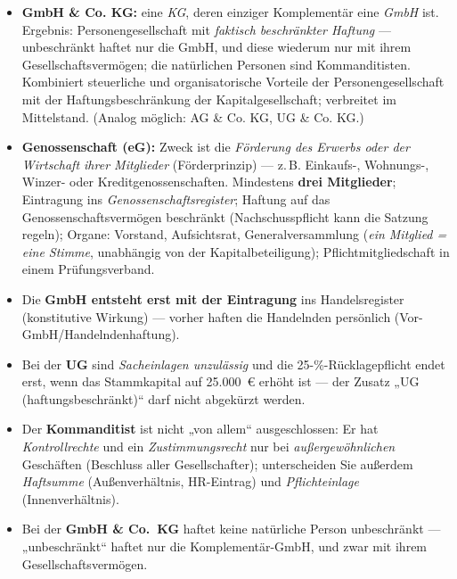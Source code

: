 \documentclass[11pt, a4paper]{article}
\begin{document}
\begin{itemize}
  \item \textbf{GmbH \& Co. KG:} eine \emph{KG}, deren einziger Komplementär eine
    \emph{GmbH} ist. Ergebnis: Personengesellschaft mit \emph{faktisch beschränkter
    Haftung} --- unbeschränkt haftet nur die GmbH, und diese wiederum nur mit ihrem
    Gesellschaftsvermögen; die natürlichen Personen sind Kommanditisten. Kombiniert
    steuerliche und organisatorische Vorteile der Personengesellschaft mit der
    Haftungsbeschränkung der Kapitalgesellschaft; verbreitet im Mittelstand.
    (Analog möglich: AG \& Co. KG, UG \& Co. KG.)
  \item \textbf{Genossenschaft (eG):} Zweck ist die \emph{Förderung des Erwerbs oder der
    Wirtschaft ihrer Mitglieder} (Förderprinzip) --- z.\,B. Einkaufs-, Wohnungs-,
    Winzer- oder Kreditgenossenschaften. Mindestens \textbf{drei Mitglieder}; Eintragung
    ins \emph{Genossenschaftsregister}; Haftung auf das Genossenschaftsvermögen
    beschränkt (Nachschusspflicht kann die Satzung regeln); Organe: Vorstand,
    Aufsichtsrat, Generalversammlung (\emph{ein Mitglied = eine Stimme}, unabhängig von
    der Kapitalbeteiligung); Pflichtmitgliedschaft in einem Prüfungsverband.
\end{itemize}

\begin{achtung}[title={\bfseries Typische Prüfungsfallen bei den Rechtsformen}]
\begin{itemize}
  \item Die \textbf{GmbH entsteht erst mit der Eintragung} ins Handelsregister
    (konstitutive Wirkung) --- vorher haften die Handelnden persönlich
    (Vor-GmbH/Handelndenhaftung).
  \item Bei der \textbf{UG} sind \emph{Sacheinlagen unzulässig} und die
    25-\%-Rücklagepflicht endet erst, wenn das Stammkapital auf 25.000~€ erhöht ist --- der Zusatz
    „UG (haftungsbeschränkt)`` darf nicht abgekürzt werden.
  \item Der \textbf{Kommanditist} ist nicht „von allem`` ausgeschlossen: Er hat
    \emph{Kontrollrechte} und ein \emph{Zustimmungsrecht} nur bei
    \emph{außergewöhnlichen} Geschäften (Beschluss aller Gesellschafter); unterscheiden Sie außerdem
    \emph{Haftsumme} (Außenverhältnis, HR-Eintrag) und \emph{Pflichteinlage}
    (Innenverhältnis).
  \item Bei der \textbf{GmbH \& Co.\ KG} haftet keine natürliche Person unbeschränkt ---
    „unbeschränkt`` haftet nur die Komplementär-GmbH, und zwar mit ihrem
    Gesellschaftsvermögen.
\end{itemize}
\end{achtung}
\end{document}
